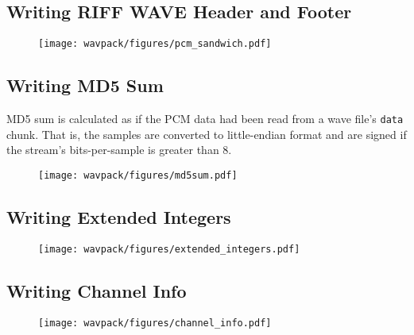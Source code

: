 \clearpage



\clearpage



\clearpage



\clearpage



\clearpage



\clearpage

\subsection{Writing RIFF WAVE Header and Footer}
\label{wavpack:write_wave_header}
\begin{figure}[h]
  \texttt{[image: wavpack/figures/pcm\_sandwich.pdf]}
\end{figure}


\subsection{Writing MD5 Sum}
\label{wavpack:write_md5}
MD5 sum is calculated as if the PCM data had been read from
a wave file's \texttt{data} chunk.
That is, the samples are converted to little-endian format
and are signed if the stream's bits-per-sample is greater than 8.
\begin{figure}[h]
  \texttt{[image: wavpack/figures/md5sum.pdf]}
\end{figure}

\subsection{Writing Extended Integers}
\label{wavpack:write_extended_integers}
\begin{figure}[h]
  \texttt{[image: wavpack/figures/extended\_integers.pdf]}
\end{figure}

\clearpage

\subsection{Writing Channel Info}
\label{wavpack:write_channel_info}
\begin{figure}[h]
  \texttt{[image: wavpack/figures/channel\_info.pdf]}
\end{figure}


